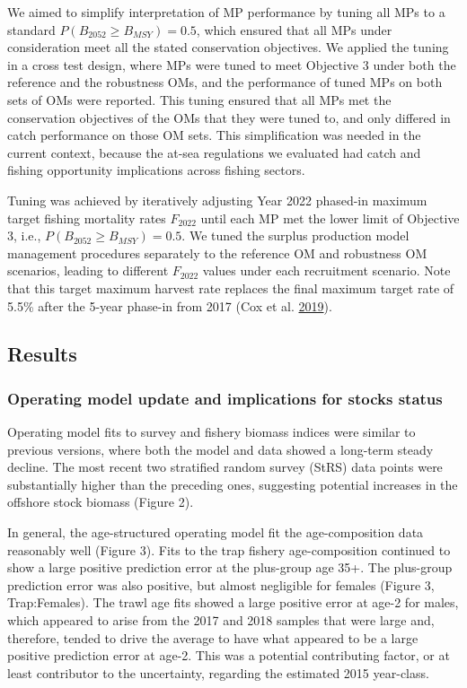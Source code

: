 \documentclass[11pt]{book}
\begin{document}
We aimed to simplify interpretation of MP performance by tuning all MPs to a standard \(P(B_{2052} \geq B_{MSY}) = 0.5\), which ensured that all MPs under consideration meet all the stated conservation objectives. We applied the tuning in a cross test design, where MPs were tuned to meet Objective 3 under both the reference and the robustness OMs, and the performance of tuned MPs on both sets of OMs were reported. This tuning ensured that all MPs met the conservation objectives of the OMs that they were tuned to, and only differed in catch performance on those OM sets. This simplification was needed in the current context, because the at-sea regulations we evaluated had catch and fishing opportunity implications across fishing sectors.

Tuning was achieved by iteratively adjusting Year 2022 phased-in maximum target fishing mortality rates \(F_{2022}\) until each MP met the lower limit of Objective 3, i.e., \(P(B_{2052} \geq B_{MSY}) = 0.5\). We tuned the surplus production model management procedures separately to the reference OM and robustness OM scenarios, leading to different \(F_{2022}\) values under each recruitment scenario. Note that this target maximum harvest rate replaces the final maximum target rate of 5.5\% after the 5-year phase-in from 2017 (Cox et al. \protect\hyperlink{ref-cox2019evaluating}{2019}).

\hypertarget{results}{%
\subsection{Results}\label{results}}

\hypertarget{operating-model-update-and-implications-for-stocks-status}{%
\subsubsection{Operating model update and implications for stocks status}\label{operating-model-update-and-implications-for-stocks-status}}

Operating model fits to survey and fishery biomass indices were similar to previous versions, where both the model and data showed a long-term steady decline. The most recent two stratified random survey (StRS) data points were substantially higher than the preceding ones, suggesting potential increases in the offshore stock biomass (Figure 2).

In general, the age-structured operating model fit the age-composition data reasonably well (Figure 3). Fits to the trap fishery age-composition continued to show a large positive prediction error at the plus-group age 35+. The plus-group prediction error was also positive, but almost negligible for females (Figure 3, Trap:Females). The trawl age fits showed a large positive error at age-2 for males, which appeared to arise from the 2017 and 2018 samples that were large and, therefore, tended to drive the average to have what appeared to be a large positive prediction error at age-2. This was a potential contributing factor, or at least contributor to the uncertainty, regarding the estimated 2015 year-class.
\end{document}
